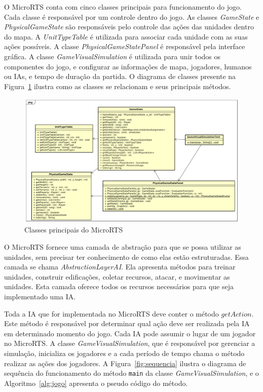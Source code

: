 O MicroRTS conta com cinco classes principais para funcionamento do jogo. 
Cada classe é responsável por um controle dentro do jogo.
As classes \textit{GameState} e \textit{PhysicalGameState} são responsáveis pelo controle das ações das unidades dentro do mapa.
A \textit{UnitTypeTable} é utilizada para associar cada unidade com as suas ações possíveis.
A classe \textit{PhysicalGameStatePanel} é responsável pela interface gráfica.
A classe \textit{GameVisualSimulation} é utilizada para unir todos os componentes do jogo, e configurar as informações de mapa, jogadores, humanos ou IAs, e tempo de duração da partida.
O diagrama de classes presente na Figura~\ref{fig:classes} ilustra como as classes se relacionam e seus principais métodos.

\begin{figure}[ht]
	\centering
	\includegraphics[width=1\textwidth]{fig/classes.pdf}
	\caption{Classes principais do MicroRTS}
	\label{fig:classes}
\end{figure} 

O MicroRTS fornece uma camada de abstração para que se possa utilizar as unidades, sem precisar ter conhecimento de como elas estão estruturadas. 
Essa camada se chama \textit{AbstractionLayerAI}. 
Ela apresenta métodos para treinar unidades, construir edificações, coletar recursos, atacar, e movimentar as unidades. 
Esta camada oferece todos os recursos necessários para que seja implementado uma IA.

Toda a IA que for implementada no MicroRTS deve conter o método $\mathit{getAction}$.
Este método é responsável por determinar qual ação deve ser realizada pela IA em determinado momento do jogo.
Cada IA pode assumir o lugar de um jogador no MicroRTS. 
A classe \textit{GameVisualSimulation}, que é responsável por gerenciar a simulação, inicializa os jogadores e a cada período de tempo chama o método realizar as ações dos jogadores.
A Figura~\ref{fig:sequencia} ilustra o diagrama de sequência do funcionamento do método \texttt{main} da classe \textit{GameVisualSimulation}, e o Algoritmo~\ref{alg:jogo} apresenta o pseudo código do método.
 
